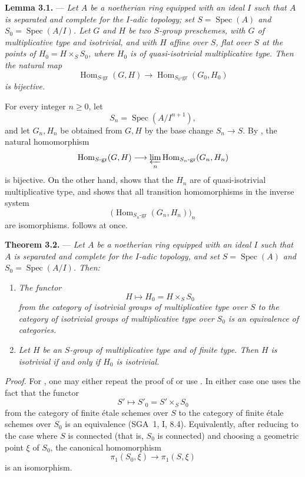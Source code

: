 \medskip
\noindent{}\textbf{Lemma 3.1.} ---
\textit{Let \(A\) be a noetherian ring equipped with an ideal \(I\)
such that \(A\) is separated and complete for the \(I\)-adic topology;
set \(S=\operatorname{Spec}(A)\) and
\(S_0=\operatorname{Spec}(A/I)\). Let \(G\) and \(H\) be two
\(S\)-group preschemes, with \(G\) of multiplicative type and
isotrivial, and with \(H\) affine over \(S\), flat over \(S\) at the
points of \(H_0=H\times_S S_0\), where \(H_0\) is of
quasi-isotrivial multiplicative type. Then the natural map
\[
  \operatorname{Hom}_{S\text{-}\mathrm{gr}}(G,H)
  \longrightarrow
  \operatorname{Hom}_{S_0\text{-}\mathrm{gr}}(G_0,H_0)
\]
is bijective.}

For every integer \(n\geq 0\), let
\[
  S_n=\operatorname{Spec}(A/I^{n+1}),
\]
and let \(G_n,H_n\) be obtained from \(G,H\) by the base change
\(S_n\to S\). By , the natural
homomorphism
\[
  \operatorname{Hom}_{S\text{-}\mathrm{gr}}(G,H)
  \longrightarrow
  \varprojlim_n
  \operatorname{Hom}_{S_n\text{-}\mathrm{gr}}(G_n,H_n)
\]
is bijective. On the other hand,  shows that the \(H_n\) are of
quasi-isotrivial multiplicative type, and  shows that all
transition homomorphisms in the inverse system
\[
  \bigl(
    \operatorname{Hom}_{S_n\text{-}\mathrm{gr}}(G_n,H_n)
  \bigr)_n
\]
are isomorphisms.  follows at once.

\medskip
\noindent{}%
\textbf{Theorem 3.2.} ---
\textit{Let \(A\) be a noetherian ring equipped with an ideal \(I\)
such that \(A\) is separated and complete for the \(I\)-adic topology,
and set \(S=\operatorname{Spec}(A)\) and
\(S_0=\operatorname{Spec}(A/I)\). Then:}
\begin{enumerate}
\item[\SGAInlineRefTarget{sga3:x:theorem:3:2:item:i}(i)]\textit{The functor
\[
  H\longmapsto H_0=H\times_S S_0
\]
from the category of isotrivial groups of multiplicative type over
\(S\) to the category of isotrivial groups of multiplicative type over
\(S_0\) is an equivalence of categories.}
\item[\SGAInlineRefTarget{sga3:x:theorem:3:2:item:ii}(ii)]\textit{Let \(H\) be an \(S\)-group of multiplicative type
and of finite type. Then \(H\) is isotrivial if and only if \(H_0\)
is isotrivial.}
\end{enumerate}

\textit{Proof.}
For , one may either repeat the proof of  or use . In either
case one uses the fact that the functor
\[
  S'\longmapsto S'_0=S'\times_S S_0
\]
from the category of finite étale schemes over \(S\) to the category
of finite étale schemes over \(S_0\) is an equivalence (SGA~1, I,
8.4). Equivalently, after reducing to the case where \(S\) is
connected (that is, \(S_0\) is connected) and choosing a geometric
point \(\xi\) of \(S_0\), the canonical homomorphism
\[
  \pi_1(S_0,\xi)\longrightarrow\pi_1(S,\xi)
\]
is an isomorphism.

